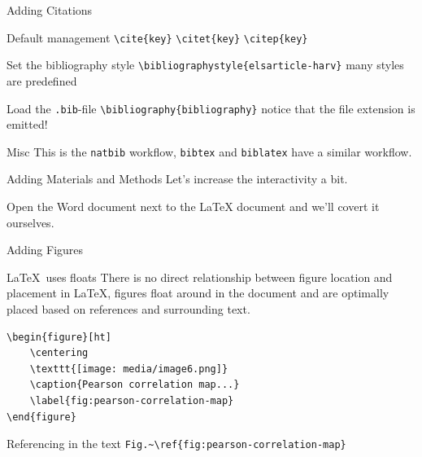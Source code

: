 \documentclass[final,aspectratio=43]{beamer}
\begin{document}
\begin{frame}[fragile]{Adding Citations}
    \begin{block}{Default management}
        \texttt{\textbackslash cite\{key\}} \texttt{\textbackslash citet\{key\}} \texttt{\textbackslash citep\{key\}}
    \end{block}
    
    \begin{block}{Set the bibliography style}
        \texttt{\textbackslash bibliographystyle\{elsarticle-harv\}} many styles are predefined
    \end{block}
    
    \begin{block}{Load the \texttt{.bib}-file}
        \texttt{\textbackslash bibliography\{bibliography\}} notice that the file extension is emitted!
    \end{block}
    

    \begin{block}{Misc}
        This is the \texttt{natbib} workflow, \texttt{bibtex} and \texttt{biblatex} have a similar workflow.
    \end{block}
\end{frame}

\begin{frame}{Adding Materials and Methods}
    Let's increase the interactivity a bit.
    
    Open the Word document next to the LaTeX document and we'll covert it ourselves.  
\end{frame}


\begin{frame}[fragile]{Adding Figures}
    \begin{block}{\LaTeX\ uses floats}
        There is no direct relationship between figure location and placement in \LaTeX, figures float around in the document and are optimally placed based on references and surrounding text. 
    \end{block}
    
    \begin{lstlisting}[basicstyle=\ttfamily\small]
\begin{figure}[ht]
    \centering
    \texttt{[image: media/image6.png]}
    \caption{Pearson correlation map...}
    \label{fig:pearson-correlation-map}
\end{figure}
    \end{lstlisting}
    
    \begin{block}{Referencing in the text}
        \texttt{Fig.\~{}\textbackslash ref\{fig:pearson-correlation-map\}}
    \end{block}
\end{frame}
\end{document}
